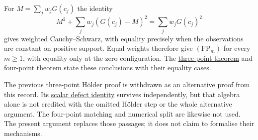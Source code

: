 \documentclass[11pt]{article}
\begin{document}
For $M=\sum_jw_jG(c_j)$ the identity
\[
 M^2+\sum_jw_j(G(c_j)-M)^2=\sum_jw_jG(c_j)^2
\]
gives weighted Cauchy--Schwarz, with equality precisely when the observations
are constant on positive support. Equal weights therefore give
$(\mathrm{FP}_m)$ for every $m\ge1$, with equality only at the zero
configuration. The
\href{https://github.com/wcook04/plectis-erdos/blob/3f1a5e9b284b9c3348eebd549e24c2f3972606ae/ErdosProblems/Erdos1041/PaperWeightedCoverageR11.lean\#L138}{three-point theorem}
and
\href{https://github.com/wcook04/plectis-erdos/blob/3f1a5e9b284b9c3348eebd549e24c2f3972606ae/ErdosProblems/Erdos1041/PaperWeightedCoverageR11.lean\#L146}{four-point theorem}
state these conclusions with their equality cases.

The previous three-point H\"older proof is withdrawn as an alternative proof
from this record. Its
\href{https://github.com/wcook04/plectis-erdos/blob/3f1a5e9b284b9c3348eebd549e24c2f3972606ae/ErdosProblems/Erdos1041/ThreePointDefectR11.lean\#L16}{scalar defect identity}
survives independently, but that algebra alone is not credited with
the omitted H\"older step or the whole alternative argument. The four-point
matching and numerical split are likewise not used. The present argument
replaces those passages; it does not claim to formalise their mechanisms.
\end{document}
